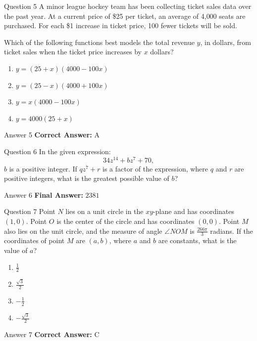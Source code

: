 \documentclass{beamer}
\begin{document}
\begin{frame}{Question 5}
\small
A minor league hockey team has been collecting ticket sales data over the past year.
At a current price of \$25 per ticket, an average of 4{,}000 seats are purchased.
For each \$1 increase in ticket price, 100 fewer tickets will be sold.

Which of the following functions best models the total revenue \(y\), in dollars,
from ticket sales when the ticket price increases by \(x\) dollars?
\vspace{0.35cm}
\begin{enumerate}
    \item[A.] \(y = (25 + x)(4000 - 100x)\)
    \item[B.] \(y = (25 - x)(4000 + 100x)\)
    \item[C.] \(y = x(4000 - 100x)\)
    \item[D.] \(y = 4000(25 + x)\)
\end{enumerate}
\end{frame}
\begin{frame}{Answer 5}
\small
\textbf{Correct Answer:} A
\end{frame}

\begin{frame}{Question 6}
\small
In the given expression:
\[
34z^{14} + bz^7 + 70,
\]
\(b\) is a positive integer. If \(qz^7 + r\) is a factor of the expression, where \(q\) and \(r\) are positive integers,
what is the greatest possible value of \(b\)?
\end{frame}
\begin{frame}{Answer 6}
\small
\textbf{Final Answer:} $\boxed{2381}$
\end{frame}

\begin{frame}{Question 7}
\small
Point \(N\) lies on a unit circle in the \(xy\)-plane and has coordinates \((1, 0)\).
Point \(O\) is the center of the circle and has coordinates \((0, 0)\).
Point \(M\) also lies on the unit circle, and the measure of angle \(\angle NOM\) is \(\frac{266\pi}{3}\) radians.
If the coordinates of point \(M\) are \((a, b)\), where \(a\) and \(b\) are constants, what is the value of \(a\)?
\vspace{0.35cm}
\begin{enumerate}
    \item[A.] \(\frac{1}{2}\)
    \item[B.] \(\frac{\sqrt{3}}{2}\)
    \item[C.] \(-\frac{1}{2}\)
    \item[D.] \(-\frac{\sqrt{3}}{2}\)
\end{enumerate}
\end{frame}
\begin{frame}{Answer 7}
\small
\textbf{Correct Answer:} C
\end{frame}
\end{document}
